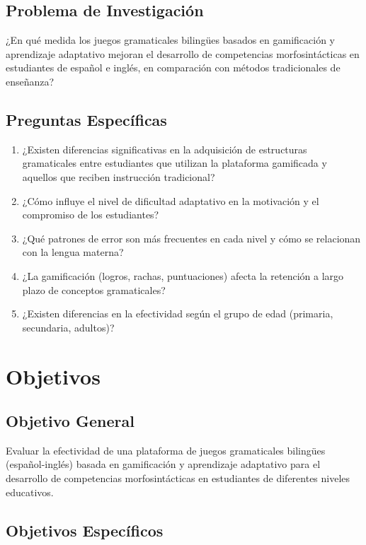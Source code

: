 \documentclass[12pt,a4paper]{article}
\begin{document}
\subsection{Problema de Investigación}

¿En qué medida los juegos gramaticales bilingües basados en gamificación y aprendizaje adaptativo mejoran el desarrollo de competencias morfosintácticas en estudiantes de español e inglés, en comparación con métodos tradicionales de enseñanza?

\subsection{Preguntas Específicas}

\begin{enumerate}
    \item ¿Existen diferencias significativas en la adquisición de estructuras gramaticales entre estudiantes que utilizan la plataforma gamificada y aquellos que reciben instrucción tradicional?
    \item ¿Cómo influye el nivel de dificultad adaptativo en la motivación y el compromiso de los estudiantes?
    \item ¿Qué patrones de error son más frecuentes en cada nivel y cómo se relacionan con la lengua materna?
    \item ¿La gamificación (logros, rachas, puntuaciones) afecta la retención a largo plazo de conceptos gramaticales?
    \item ¿Existen diferencias en la efectividad según el grupo de edad (primaria, secundaria, adultos)?
\end{enumerate}

\section{Objetivos}

\subsection{Objetivo General}

Evaluar la efectividad de una plataforma de juegos gramaticales bilingües (español-inglés) basada en gamificación y aprendizaje adaptativo para el desarrollo de competencias morfosintácticas en estudiantes de diferentes niveles educativos.

\subsection{Objetivos Específicos}
\end{document}
